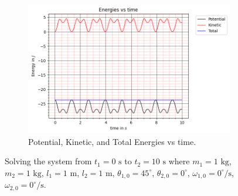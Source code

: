\begin{figure}[H]
\begin{subfigure}[b]{0.49\textwidth}
        \centering
        \includegraphics[width=\textwidth]{figures/initial-conditions-a/Energies vs Time.png}
        \caption{Potential, Kinetic, and Total Energies vs time.}
        \label{fig:2e}
    \end{subfigure}
    \caption{Solving the system from $t_1 = 0\text{ s}$ to $t_2 = 10\text{ s}$ where $m_1 = 1\text{ kg}$, $m_2 = 1\text{ kg}$, $l_1 = 1\text{ m}$, $l_2 = 1\text{ m}$, $\theta_{1,0} = 45^\circ$, $\theta_{2,0} = 0^\circ$, $\omega_{1,0} = 0^\circ\text{/s}$, $\omega_{2,0} = 0^\circ\text{/s}$.}
    \label{fig:2}
\end{figure}

